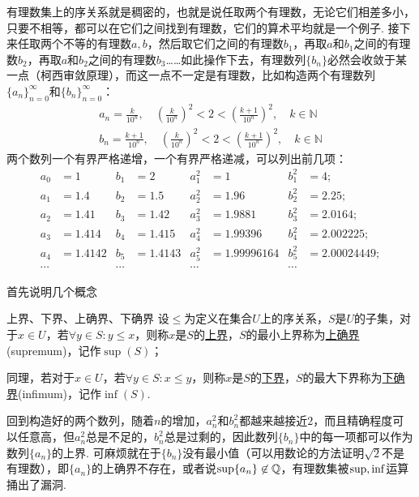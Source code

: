 \documentclass[main.tex]{subfiles}
\begin{document}
有理数集上的序关系就是稠密的，也就是说任取两个有理数，无论它们相差多小，只要不相等，都可以在它们之间找到有理数，它们的算术平均就是一个例子. 接下来任取两个不等的有理数\(a,b\)，然后取它们之间的有理数\(b_1\)，再取\(a\)和\(b_1\)之间的有理数\(b_2\)，再取\(a\)和\(b_2\)之间的有理数\(b_3\)……如此操作下去，有理数列\(\{b_n\}\)必然会收敛于某一点（柯西审敛原理），而这一点不一定是有理数，比如构造两个有理数列\(\{a_n\}_{n=0}^{\infty}\)和\(\{b_n\}_{n=0}^{\infty}\)：
\begin{eqnarray*}
    a_n=\frac{k}{10^n}, \quad\left(\frac{k}{10^n}\right)^2<2<\left(\frac{k+1}{10^n}\right)^2, \quad k\in\mathbb{N} \\
    b_n=\frac{k+1}{10^n}, \quad\left(\frac{k}{10^n}\right)^2<2<\left(\frac{k+1}{10^n}\right)^2, \quad k\in\mathbb{N}
\end{eqnarray*}
两个数列一个有界严格递增，一个有界严格递减，可以列出前几项：
\newline
\begin{align*}
a_0 &= 1 & b_1 &= 2 & a_1^2 &= 1 & b_1^2 &= 4; \\
a_1 &= 1.4 & b_2 &= 1.5 & a_2^2 &= 1.96 & b_2^2 &= 2.25; \\
a_2 &= 1.41 & b_3 &= 1.42 & a_3^2 &= 1.9881 & b_3^2 &= 2.0164; \\
a_3 &= 1.414 & b_4 &= 1.415 & a_4^2 &= 1.99396 & b_4^2 &= 2.002225; \\
a_4 &= 1.4142 & b_5 &= 1.4143 & a_5^2 &= 1.99996164 & b_5^2 &= 2.00024449; \\
\cdots & & \cdots && \cdots && \cdots
\end{align*}

首先说明几个概念
\begin{definition}{上界、下界、上确界、下确界}
    设\(\leq\)为定义在集合\(U\)上的序关系，\(S\)是\(U\)的子集，对于\(x \in U\)，若\(\forall y\in S: y\leq x\)，则称\(x\)是\(S\)的\uline{上界}，\(S\)的最小上界称为\uline{上确界}(supremum)，记作\(\sup(S)\)；
    \par
    同理，若对于\(x \in U\)，若\(\forall y\in S: x\leq y\)，则称\(x\)是\(S\)的\uline{下界}，\(S\)的最大下界称为\uline{下确界}(infimum)，记作\(\inf(S)\).
\end{definition}

回到构造好的两个数列，随着\(n\)的增加，\(a_n^2\)和\(b_n^2\)都越来越接近\(2\)，而且精确程度可以任意高，但\(a_n^2\)总是不足的，\(b_n^2\)总是过剩的，因此数列\(\{b_n\}\)中的每一项都可以作为数列\(\{a_n\}\)的上界. 可麻烦就在于\(\{b_n\}\)没有最小值（可以用数论的方法证明\(\sqrt{2}\)不是有理数），即\(\{a_n\}\)的上确界不存在，或者说\({\rm sup}\{a_n\}\not \in \mathbb{Q}\)，有理数集被\({\rm sup},{\rm inf}\)运算捅出了漏洞.
\end{document}
